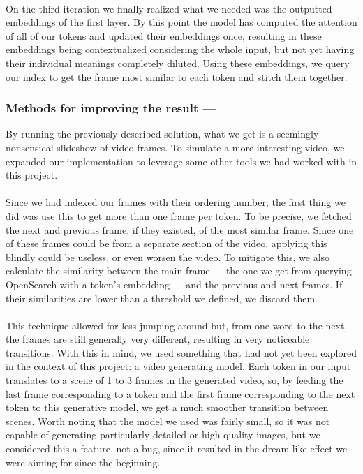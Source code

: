 \documentclass[runningheads]{llncs}
\begin{document}
\paragraph{}
On the third iteration we finally realized what we needed was the outputted embeddings of the first layer. By this point the model has computed the attention of all of our tokens and updated their embeddings once, resulting in these embeddings being contextualized considering the whole input, but not yet having their individual meanings completely diluted. Using these embeddings, we query our index to get the frame most similar to each token and stitch them together.

\subsubsection{Methods for improving the result —}
By running the previously described solution, what we get is a seemingly nonsensical slideshow of video frames. To simulate a more interesting video, we expanded our implementation to leverage some other tools we had worked with in this project. 
\paragraph{}
Since we had indexed our frames with their ordering number, the first thing we did was use this to get more than one frame per token. To be precise, we fetched the next and previous frame, if they existed, of the most similar frame. Since one of these frames could be from a separate section of the video, applying this blindly could be useless, or even worsen the video. To mitigate this, we also calculate the similarity between the main frame — the one we get from querying OpenSearch with a token's embedding — and the previous and next frames. If their similarities are lower than a threshold we defined, we discard them. 
\paragraph{}
This technique allowed for less jumping around but, from one word to the next, the frames are still generally very different, resulting in very noticeable transitions. With this in mind, we used something that had not yet been explored in the context of this project: a video generating model. Each token in our input translates to a scene of 1 to 3 frames in the generated video, so, by feeding the last frame corresponding to a token and the first frame corresponding to the next token to this generative model, we get a much smoother transition between scenes. Worth noting that the model we used was fairly small, so it was not capable of generating particularly detailed or high quality images, but we considered this a feature, not a bug, since it resulted in the dream-like effect we were aiming for since the beginning.
\end{document}
